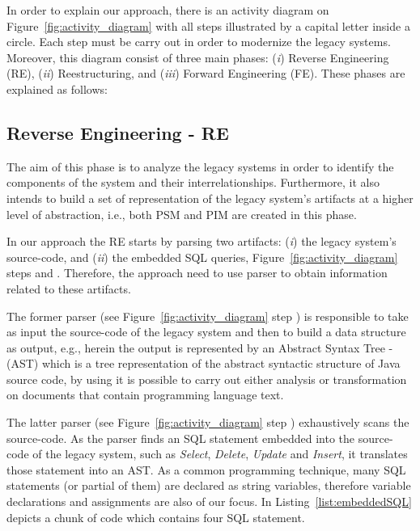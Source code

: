 \documentclass[a4paper,twoside]{article}
\newcommand*\circled[1]{\tikz[baseline=(char.base)]{
  \node[shape=circle,draw, inner sep=0.1pt] (char) {#1};}
}
\begin{document}

In order to explain our approach, there is an activity diagram on Figure~\ref{fig:activity_diagram} with all steps illustrated by a capital letter inside a circle. Each step must be carry out in order to modernize the legacy systems. Moreover, this diagram consist of three main phases: (\textit{i}) Reverse Engineering (RE), (\textit{ii}) Reestructuring, and (\textit{iii}) Forward Engineering (FE). These phases are explained as follows:



\subsection{Reverse Engineering - RE} 

The aim of this phase is to analyze the legacy systems in order to identify the components of the system and their interrelationships. Furthermore, it also intends to build a set of representation of the legacy system's artifacts at a higher level of abstraction, i.e., both PSM and PIM are created in this phase. 

In our approach the RE starts by parsing two artifacts: (\textit{i}) the legacy system's source-code, and (\textit{ii}) the embedded SQL queries, Figure~\ref{fig:activity_diagram} steps \circled{\textbf{A}} and \circled{\textbf{B}}. Therefore, the  approach need to use parser to obtain information related to these artifacts. 

The former parser (see Figure~\ref{fig:activity_diagram} step \circled{\textbf{A}}) is responsible to take as input the source-code of the legacy system and then to build a data structure as output, e.g., herein the output is represented by an Abstract Syntax Tree - (AST)  which is a tree representation of the abstract syntactic structure of Java source code, by using it is possible to carry out either analysis or transformation on documents that contain programming language text.


 The latter parser (see Figure~\ref{fig:activity_diagram} step \circled{\textbf{B}}) exhaustively scans the source-code. As the parser finds an SQL statement embedded into the source-code of the legacy system, such as \textit{Select}, \textit{Delete}, \textit{Update} and \textit{Insert}, it translates those statement into an AST. As a common programming technique, many SQL statements (or partial of them) are declared as string variables, therefore variable  declarations and assignments are also of our focus.
In Listing~\ref{list:embeddedSQL} depicts a chunk of code which contains four SQL statement. 
\end{document}
